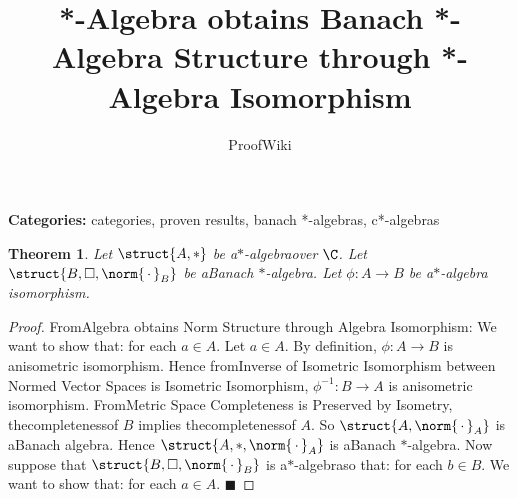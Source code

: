 \documentclass{article}
\title{*-Algebra obtains Banach *-Algebra Structure through *-Algebra Isomorphism}
\author{ProofWiki}
\date{}
\newtheorem{theorem}{Theorem}
\begin{document}
\maketitle

\noindent\textbf{Categories:} categories, proven results, banach *-algebras, c*-algebras

\begin{theorem}
Let $\struct {A, \ast}$ be a$\ast$-algebraover $\C$. Let $\struct {B, \square, \norm {\, \cdot \,}_B}$ be aBanach $\ast$-algebra. Let $\phi : A \to B$ be a$\ast$-algebra isomorphism.
\end{theorem}

\begin{proof}
FromAlgebra obtains Norm Structure through Algebra Isomorphism: We want to show that: for each $a \in A$. Let $a \in A$. By definition, $\phi : A \to B$ is anisometric isomorphism. Hence fromInverse of Isometric Isomorphism between Normed Vector Spaces is Isometric Isomorphism, $\phi^{-1} : B \to A$ is anisometric isomorphism. FromMetric Space Completeness is Preserved by Isometry, thecompletenessof $B$ implies thecompletenessof $A$. So $\struct {A, \norm {\, \cdot \,}_A}$ is aBanach algebra. Hence $\struct {A, \ast, \norm {\, \cdot \,}_A}$ is aBanach $\ast$-algebra. Now suppose that $\struct {B, \square, \norm {\, \cdot \,}_B}$ is a$\ast$-algebraso that: for each $b \in B$. We want to show that: for each $a \in A$. $\blacksquare$
\end{proof}
\end{document}
